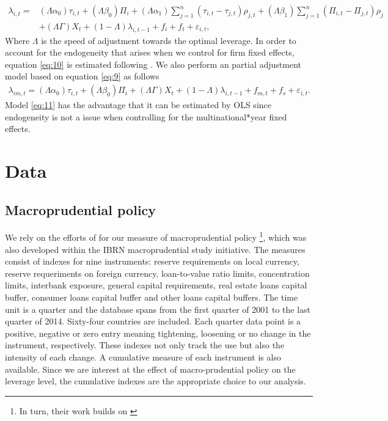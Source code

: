 \documentclass[12pt]{article}
\begin{document}
	\begin{equation}
	\begin{aligned}
	\lambda_{i,t}=&(\Lambda\alpha_0)\tau_{i,t}+(\Lambda\beta_0)\Pi_i+(\Lambda\alpha_1)\sum_{j=1}^{n}(\tau_{i,t}-\tau_{j,t})\rho_{j,t}+(\Lambda\beta_1)\sum_{j=1}^{n}(\Pi_{i,t}-\Pi_{j,t})\rho_j\\
	&+(\Lambda\Gamma)X_{t}+(1-\Lambda)\lambda_{i,t-1}+f_i+f_t+\varepsilon_{i,t},
	\label{eq:10}
	\end{aligned}
	\end{equation}
	Where $\Lambda$ is the speed of adjustment towards the optimal leverage. In order to account for the endogeneity that arises when we control for firm fixed effects, equation \ref{eq:10} is estimated following \cite*{arellano1991some}. We also perform an partial adjustment model based on equation \ref{eq:9} as follows
	\begin{equation}
	\begin{aligned}
	\lambda_{im,t}=(\Lambda\alpha_0)\tau_{i,t}+(\Lambda\beta_0)\Pi_i
	+(\Lambda\Gamma) X_{t}+(1-\Lambda)\lambda_{i,t-1}+f_{m,t}+f_{s}+\varepsilon_{i,t}.
	\label{eq:11}
	\end{aligned}
	\end{equation}
	 Model \ref{eq:11} has the advantage that it can be estimated by OLS since endogeneity is not a issue when controlling for the multinational*year fixed effects. 
	\section{Data} \label{sec:data}
	\subsection{Macroprudential policy} \label{subsec:MPI}
	
	We rely on the efforts of \cite*{cerutti2017changes} for our measure of macroprudential policy \footnote{In turn, their work builds on \cite*{cerutti2015use}}, which was also developed within the IBRN macroprudential study initiative. The measures consist of indexes for nine instruments: reserve requirements on local currency, reserve requeriments on foreign currency, loan-to-value ratio limits, concentration limits, interbank exposure, general capital requirements, real estate loans capital buffer, consumer loans capital buffer and other loans capital buffers. The time unit is a quarter and the database spans from the first quarter of 2001 to the last quarter of 2014. Sixty-four countries are included. Each quarter data point is a positive, negative or zero entry meaning tightening, loosening or no change in the instrument, respectively. These indexes not only track the use but also the intensity of each change. A cumulative measure of each instrument is also available. Since we are interest at the effect of macro-prudential policy on the leverage level, the cumulative indexes are the appropriate choice to our analysis. 
	
\end{document}
